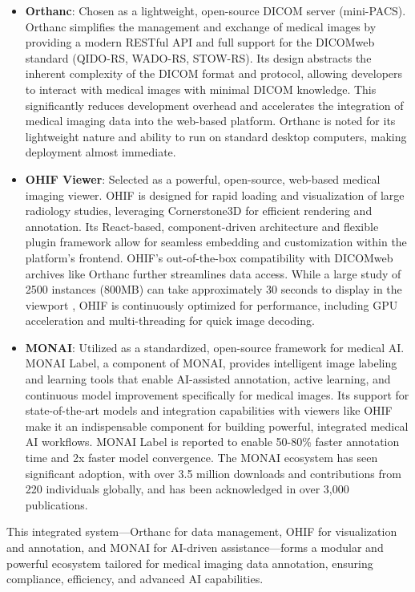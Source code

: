 \begin{itemize}
    \item \textbf{Orthanc}: Chosen as a lightweight, open-source DICOM server (mini-PACS). Orthanc simplifies the management and exchange of medical images by providing a modern RESTful API and full support for the DICOMweb standard (QIDO-RS, WADO-RS, STOW-RS). Its design abstracts the inherent complexity of the DICOM format and protocol, allowing developers to interact with medical images with minimal DICOM knowledge. This significantly reduces development overhead and accelerates the integration of medical imaging data into the web-based platform. Orthanc is noted for its lightweight nature and ability to run on standard desktop computers, making deployment almost immediate.
    \item \textbf{OHIF Viewer}: Selected as a powerful, open-source, web-based medical imaging viewer. OHIF is designed for rapid loading and visualization of large radiology studies, leveraging Cornerstone3D for efficient rendering and annotation. Its React-based, component-driven architecture and flexible plugin framework allow for seamless embedding and customization within the platform's frontend. OHIF's out-of-the-box compatibility with DICOMweb archives like Orthanc further streamlines data access. While a large study of 2500 instances (800MB) can take approximately 30 seconds to display in the viewport , OHIF is continuously optimized for performance, including GPU acceleration and multi-threading for quick image decoding.
    \item \textbf{MONAI}: Utilized as a standardized, open-source framework for medical AI. MONAI Label, a component of MONAI, provides intelligent image labeling and learning tools that enable AI-assisted annotation, active learning, and continuous model improvement specifically for medical images. Its support for state-of-the-art models and integration capabilities with viewers like OHIF make it an indispensable component for building powerful, integrated medical AI workflows. MONAI Label is reported to enable 50-80\% faster annotation time and 2x faster model convergence. The MONAI ecosystem has seen significant adoption, with over 3.5 million downloads and contributions from 220 individuals globally, and has been acknowledged in over 3,000 publications.
\end{itemize}

This integrated system—Orthanc for data management, OHIF for visualization and annotation, and MONAI for AI-driven assistance—forms a modular and powerful ecosystem tailored for medical imaging data annotation, ensuring compliance, efficiency, and advanced AI capabilities. 

